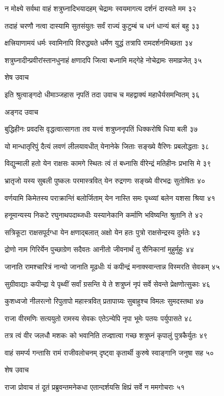 न मोक्ष्ये सर्वथा वाहं शत्रुघ्नादिभयादहम्
चेद्रामः स्वयमागत्य दर्शनं दास्यते मम ३२

तदाहं चरणौ नत्वा दास्यामि सुतसंयुतः
सर्वं राज्यं कुटुम्बं च धनं धान्यं बलं बहु ३३

क्षत्त्रियाणामयं धर्मः स्वामिनापि विरुद्ध्यते
धर्मेण युद्धं तत्रापि रामदर्शनमिच्छता ३४

शत्रुघ्नादीन्प्रवीरांस्तानधुनाहं क्षणादपि
जित्वा बध्नामि मद्गेहे नोचेद्रामः समाव्रजेत् ३५

शेष उवाच

इति श्रुत्वाङ्गदो धीमाञ्जहास नृपतिं तदा
उवाच च महद्वाक्यं महाधैर्यसमन्वितम् ३६

अङ्गद उवाच

बुद्धिहीनः प्रवदसि वृद्धत्वात्सागता तव
यत्त्वं शत्रुघ्ननृपतिं धिक्करोषि धिया बली ३७

यो मान्धातृरिपुं दैत्यं लवणं लीलयावधीत्
येनानेके जिताः सङ्ख्ये वैरिणः प्रबलोद्धताः ३८

विद्युन्माली हतो येन राक्षसः कामगे स्थितः
त्वं तं बध्नासि वीरेन्द्रं मतिहीनः प्रभासि मे ३९

भ्रातृजो यस्य सुबली पुष्कलः परमास्त्रवित्
येन रुद्रगणः सङ्ख्ये वीरभद्रः सुतोषितः ४०

वर्णयामि किमेतस्य पराक्रान्तिं बलोर्जिताम्
येन नास्ति समः पृथ्व्यां बलेन यशसा श्रिया ४१

हनूमान्यस्य निकटे रघुनाथपदाब्जधीः
यस्यानेकानि कर्माणि भविष्यन्ति श्रुतानि ते ४२

सत्रिकूटा राक्षसपूर्दग्धा येन क्षणाद्बलात्
अक्षो येन हतः पुत्रो राक्षसेन्द्रस्य दुर्मतेः ४३

द्रोणो नाम गिरिर्येन पुच्छाग्रेण सदैवतः
आनीतो जीवनार्थं तु सैनिकानां मुहुर्मुहुः ४४

जानाति रामश्चारित्रं नान्यो जानाति मूढधीः
यं कपीन्द्रं मनाक्स्वान्तान्न विस्मरति सेवकम् ४५

सुग्रीवाद्याः कपीन्द्रा ये पृथ्वीं सर्वां ग्रसन्ति ये
ते शत्रुघ्नं नृपं सर्वे सेवन्ते प्रेक्षणोत्सुकाः ४६

कुशध्वजो नीलरत्नो रिपुतापो महास्त्रवित्
प्रतापाग्र्यः सुबाहुश्च विमलः सुमदस्तथा ४७

राजा वीरमणिः सत्ययुतो रामस्य सेवकः
एतेऽन्येपि नृपा भूमेः पतयः पर्युपासते ४८

तत्र त्वं वीर जलधौ मशकः को भवानिति
तज्ज्ञात्वा गच्छ शत्रुघ्नं कृपालुं पुत्रकैर्युतः ४९

वाहं समर्प्य गन्तासि रामं राजीवलोचनम्
दृष्ट्वा कृतार्थी कुरुषे स्वाङ्गानि जनुषा सह ५०

शेष उवाच

राजा प्रोवाच तं दूतं प्रब्रुवन्तमनेकधा
एतान्दर्शयसि क्षिप्रं सर्वे न ममगोचराः ५१

